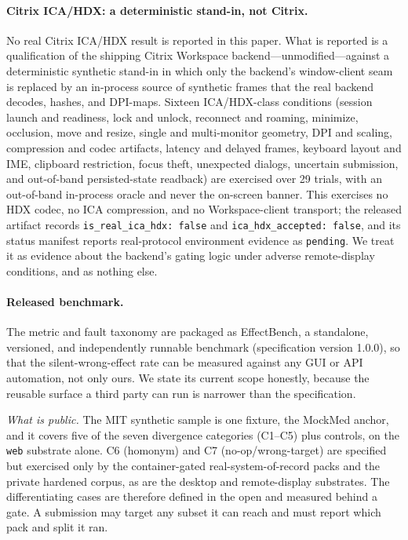 \paragraph{Citrix ICA/HDX: a deterministic stand-in, not Citrix.}
No real Citrix ICA/HDX result is reported in this paper. What is reported is a
qualification of the shipping Citrix Workspace backend---unmodified---against a
deterministic synthetic stand-in in which only the backend's window-client seam
is replaced by an in-process source of synthetic frames that the real backend
decodes, hashes, and DPI-maps. Sixteen ICA/HDX-class conditions (session launch
and readiness, lock and unlock, reconnect and roaming, minimize, occlusion, move
and resize, single and multi-monitor geometry, DPI and scaling, compression and
codec artifacts, latency and delayed frames, keyboard layout and IME, clipboard
restriction, focus theft, unexpected dialogs, uncertain submission, and
out-of-band persisted-state readback) are exercised over 29 trials, with an
out-of-band in-process oracle and never the on-screen banner. This exercises no
HDX codec, no ICA compression, and no Workspace-client transport; the released
artifact records \texttt{is\_real\_ica\_hdx: false} and
\texttt{ica\_hdx\_accepted: false}, and its status manifest reports
real-protocol environment evidence as \texttt{pending}. We treat it as evidence
about the backend's gating logic under adverse remote-display conditions, and as
nothing else.

\paragraph{Released benchmark.}
The metric and fault taxonomy are packaged as EffectBench, a standalone,
versioned, and independently runnable benchmark (specification version 1.0.0), so
that the silent-wrong-effect rate can be measured against any GUI or API
automation, not only ours. We state its current scope honestly, because the
reusable surface a third party can run is narrower than the specification.

\emph{What is public.} The MIT synthetic sample is one fixture, the MockMed
anchor, and it covers five of the seven divergence categories (C1--C5) plus
controls, on the \texttt{web} substrate alone. C6 (homonym) and C7
(no-op/wrong-target) are specified but exercised only by the container-gated
real-system-of-record packs and the private hardened corpus, as are the desktop
and remote-display substrates. The differentiating cases are therefore defined in
the open and measured behind a gate. A submission may target any subset it can
reach and must report which pack and split it ran.

